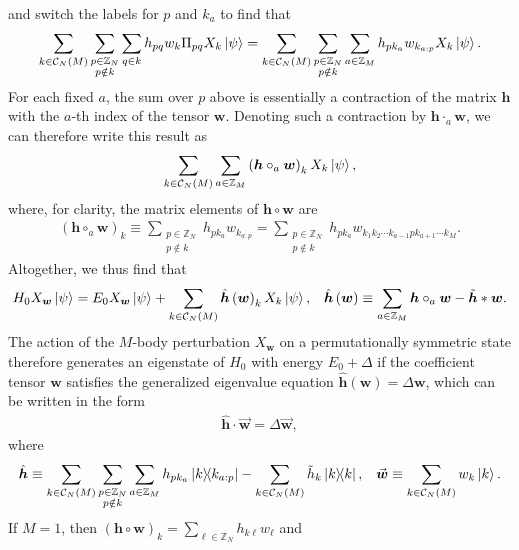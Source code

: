 \documentclass[nofootinbib,notitlepage,11pt]{revtex4-2}
\newcommand{\p}[1]{\left(#1\right)} %
\renewcommand{\c}{\cdot} %
\newcommand{\m}{\bm} %
\renewcommand{\v}{\vec} %
\newcommand{\1}{\mathds{1}}
\newcommand{\C}{\mathcal{C}}
\newcommand{\ZZ}{\mathbb{Z}}
\begin{document}
and switch the labels for $p$ and $k_a$ to find that
\begin{align}
  \sum_{k\in\C_N\p{M}} \sum_{\substack{p\in\ZZ_N\\p\notin k}}
  \sum_{q\in k} h_{pq} w_k  \Pi_{pq} X_k \ket\psi
  = \sum_{k\in\C_N\p{M}} \sum_{\substack{p\in\ZZ_N\\p\notin k}}
  \sum_{a\in\ZZ_M} h_{pk_a} w_{k_{a:p}} X_k \ket\psi.
\end{align}
For each fixed $a$, the sum over $p$ above is essentially a
contraction of the matrix $\m h$ with the $a$-th index of the tensor
$\m w$.  Denoting such a contraction by $\m h\c_a\m w$, we can
therefore write this result as
\begin{align}
  \sum_{k\in\C_N\p{M}} \sum_{a\in\ZZ_M}
  \p{\m h \circ_a \m w}_k X_k \ket\psi,
\end{align}
where, for clarity, the matrix elements of $\m h\circ\m w$ are
\begin{align}
  \p{\m h \circ_a \m w}_k
  \equiv \sum_{\substack{p\in\ZZ_N\\p\notin k}} h_{pk_a} w_{k_{a:p}}
  = \sum_{\substack{p\in\ZZ_N\\p\notin k}}
  h_{pk_a} w_{k_1 k_2 \cdots k_{a-1} p k_{a+1} \cdots k_M}.
\end{align}
Altogether, we thus find that
\begin{align}
  H_0 X_{\m w} \ket\psi
  = E_0 X_{\m w} \ket\psi + \sum_{k\in\C_N\p{M}}
  \hat{\m h}\p{\m w}_k X_k \ket\psi,
  &&
  \hat{\m h}\p{\m w}
  \equiv \sum_{a\in\ZZ_M} \m h \circ_a \m w - \tilde{\m h} * \m w.
  \label{eq:diagnosis_end}
\end{align}
The action of the $M$-body perturbation $X_{\m w}$ on a
permutationally symmetric state therefore generates an eigenstate of
$H_0$ with energy $E_0+\Delta$ if the coefficient tensor $\m w$
satisfies the generalized eigenvalue equation
$\hat{\m h}\p{\m w} = \Delta \m w$, which can be written in the form
\begin{align}
  \hat{\m h} \c \v{\m w} = \Delta \v{\m w},
  \label{eq:multi_body_eig_mat}
\end{align}
where
\begin{align}
  \hat{\m h} \equiv \sum_{k\in\C_N\p{M}}
  \sum_{\substack{p\in\ZZ_N\\p\notin k}}
  \sum_{a\in\ZZ_M} h_{pk_a} \op{k}{k_{a:p}}
  - \sum_{k\in\C_N\p{M}} \tilde h_k \op{k},
  &&
  \v{\m w} \equiv \sum_{k\in\C_N\p{M}} w_k \ket{k}.
\end{align}
If $M=1$, then
$\p{\m h\circ\m w}_k=\sum_{\ell\in\ZZ_N} h_{k\ell} w_\ell$ and
\end{document}
